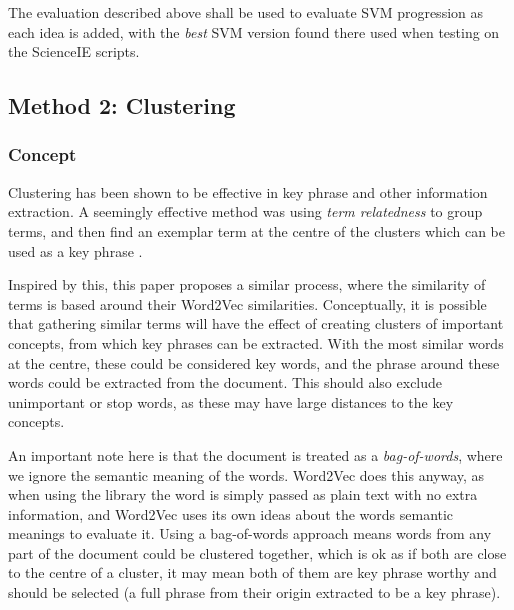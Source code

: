 The evaluation described above shall be used to evaluate SVM progression as each idea is added, with the \textit{best} SVM version found there used when testing on the ScienceIE scripts.

\subsection{Method 2: Clustering}
\subsubsection*{Concept}
Clustering has been shown to be effective in key phrase and other information extraction. A seemingly effective method was using \textit{term relatedness} to group terms, and then find an exemplar term at the centre of the clusters which can be used as a key phrase \cite{Liu2009}. 

Inspired by this, this paper proposes a similar process, where the similarity of terms is based around their Word2Vec similarities. Conceptually, it is possible that gathering similar terms will have the effect of creating clusters of important concepts, from which key phrases can be extracted. With the most similar words at the centre, these could be considered key words, and the phrase around these words could be extracted from the document. This should also exclude unimportant or stop words, as these may have large distances to the key concepts. 

An important note here is that the document is treated as a \textit{bag-of-words}, where we ignore the semantic meaning of the words. Word2Vec does this anyway, as when using the library the word is simply passed as plain text with no extra information, and Word2Vec uses its own ideas about the words semantic meanings to evaluate it. Using a bag-of-words approach means words from any part of the document could be clustered together, which is ok as if both are close to the centre of a cluster, it may mean both of them are key phrase worthy and should be selected (a full phrase from their origin extracted to be a key phrase).

